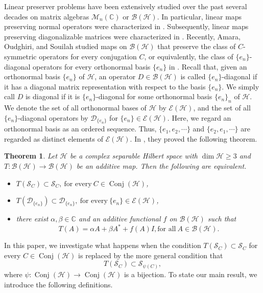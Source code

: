 \documentclass[11pt]{amsart}
\newtheorem{theorem}{Theorem}
\theoremstyle{remark}
\newcommand{\BH}{\mathcal{B(H)}}
\newcommand{\bC}{\mathbb{C}}
\newcommand{\cH}{{\mathcal{H}}}
\newcommand{\SC}{\mathcal{S}_C}
\newcommand{\Conj}{\operatorname{Conj}(\cH)}
\newcommand{\MC}{\mathcal{M}_n(\bC)}
\begin{document}
Linear preserver problems have been extensively studied over the past several decades on matrix algebras $\MC$ or $\BH$. 
In particular, linear maps preserving normal operators were characterized in \cite{Brs}. 
Subsequently, linear maps preserving diagonalizable matrices were characterized in \cite{OS}. 
Recently, Amara, Oudghiri, and Souilah studied maps on $\BH$ that preserve the class of $C$-symmetric operators for every conjugation $C$, or equivalently, the class of $\{e_n\}$-diagonal operators for every orthonormal basis $\{e_n\}$ in \cite{AOS}. Recall that, given an orthonormal basis $\{e_n\}$ of $\cH$, an operator $D \in \BH$ is called $\{e_n\}$-diagonal if it has a diagonal matrix representation with respect to the basis $\{e_n\}$. We simply call $D$ is diagonal if it is $\{e_n\}$-diagonal for some orthonormal basis $\{e_n\}_{n}$ of $\cH$. We denote the set of all orthonormal bases of $\cH$ by $\mathcal{E}(\cH)$, and the set of all $\{e_n\}$-diagonal operators by $\mathcal{D}_{\{e_n\}}$ for $\{e_n\} \in \mathcal{E}(\cH)$. Here, we regard an orthonormal basis as an ordered sequence. Thus, $\{e_1, e_2, \cdots \}$ and $\{e_2, e_1, \cdots \}$ are regarded as distinct elements of $\mathcal{E}(\cH)$. 
In \cite{AOS}, they proved the following theorem. 
\begin{theorem}{\cite[Theorem 1]{AOS}}\label{AOST}
Let $\cH$ be a complex separable Hilbert space with $\dim \cH \ge 3$ and $T: \BH \to \BH$ be an additive map. Then the following are equivalent.
\begin{itemize}
\item[(1)] $T(\SC) \subset \SC, \ \text{for every} \ C \in \Conj$,
\item[(2)] $T(\mathcal{D}_{\{e_n\}}) \subset \mathcal{D}_{\{e_n\}},  \ \text{for every} \ \{e_n\} \in \mathcal{E}(\cH)$,
\item[(3)] there exist $\alpha, \beta \in \mathbb{C}$ and an additive functional $f$ on $\BH$ such that 
\[
T(A)=\alpha A+\beta A^{*}+f(A)I, \text{for all} \ A \in \BH.
\]
\end{itemize}
\end{theorem}

In this paper, we investigate what happens when the condition 
$T(\SC) \subset \SC$ for every $C \in \Conj$
is replaced by the more general condition that  
\[
T(\SC) \subset \mathcal{S}_{\psi(C)},
\]
where $\psi:\Conj \to \Conj$ is a bijection. To state our main result, we introduce the following definitions.
\end{document}
